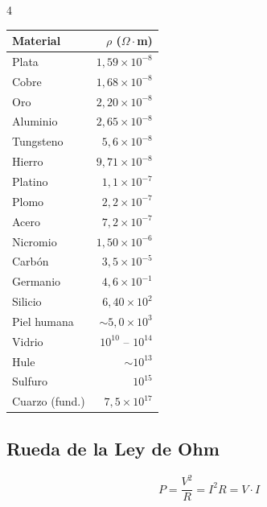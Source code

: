 \documentclass[9pt, landscape, letterpaper]{extarticle}
\begin{document}
\begin{multicols}{4}
  \begin{tablabox}
    \tablacompacta
    \begin{tabular}{@{}lr@{}}
      \toprule
      Material       & $\rho$ ($\Omega \cdot$m)   \\
      \midrule
      Plata          & $1{,}59 \times 10^{-8}$    \\
      Cobre          & $1{,}68 \times 10^{-8}$    \\
      Oro            & $2{,}20 \times 10^{-8}$    \\
      Aluminio       & $2{,}65 \times 10^{-8}$    \\
      Tungsteno      & $5{,}6 \times 10^{-8}$     \\
      Hierro         & $9{,}71 \times 10^{-8}$    \\
      Platino        & $1{,}1 \times 10^{-7}$     \\
      Plomo          & $2{,}2 \times 10^{-7}$     \\
      Acero          & $7{,}2 \times 10^{-7}$     \\
      Nicromio       & $1{,}50 \times 10^{-6}$    \\
      Carbón         & $3{,}5 \times 10^{-5}$     \\
      Germanio       & $4{,}6 \times 10^{-1}$     \\
      Silicio        & $6{,}40 \times 10^{2}$     \\
      Piel humana    & $\sim 5{,}0 \times 10^{3}$ \\
      Vidrio         & $10^{10}$ -- $10^{14}$     \\
      Hule           & $\sim 10^{13}$             \\
      Sulfuro        & $10^{15}$                  \\
      Cuarzo (fund.) & $7{,}5 \times 10^{17}$     \\
      \bottomrule
    \end{tabular}
  \end{tablabox}

  \subsection{Rueda de la Ley de Ohm}

  \begin{tablabox}[Potencia $P$ (W)]
    \tablacompacta
    $$P = \frac{V^2}{R} = I^2 R = V \cdot I$$
  \end{tablabox}


\end{multicols}
\end{document}

